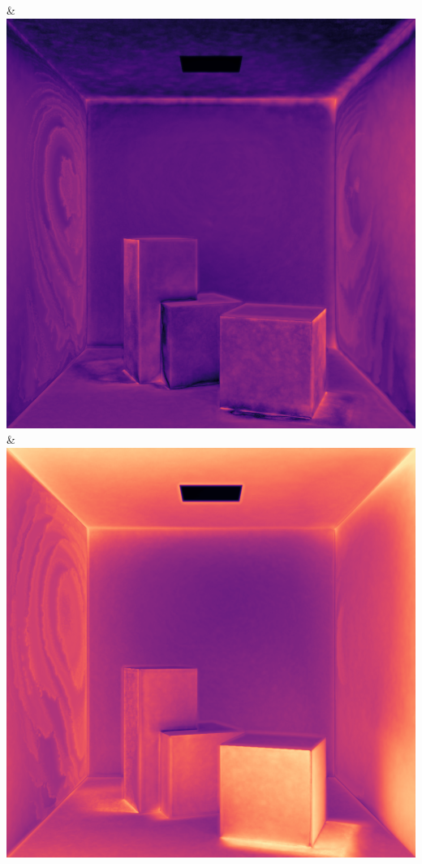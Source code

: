 & \includegraphics[width=\linewidth]{figures/py/tests/quality_comparison/nrc+bt_1min_flip.png}
& \includegraphics[width=\linewidth]{figures/py/tests/quality_comparison/nrc+lt_1min_flip.png}
